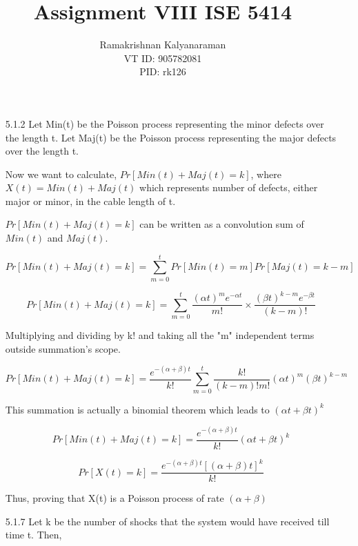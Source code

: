 \documentclass[a4paper,oneside,12pt]{report}
\begin{document}
\pagestyle{empty} %



\title{Assignment VIII ISE 5414}
\author{Ramakrishnan Kalyanaraman\\
VT ID: 905782081\\
PID: rk126}
\maketitle

\begin{enumerate}
	\item[5.1.2] Let Min(t) be the Poisson process representing the minor defects over the length t. Let Maj(t) be the Poisson process representing the major defects over the length t.
	
	Now we want to calculate, $Pr[Min(t) + Maj(t) = k]$, where $X(t) = Min(t) + Maj(t)$ which represents number of defects, either major or minor, in the cable length of t.
	
	$Pr[Min(t) + Maj(t) = k]$ can be written as a convolution sum of $Min(t)$ and $Maj(t)$.
	
	$$Pr[Min(t) + Maj(t) = k] = \sum_{m = 0}^{t}{Pr[Min(t) = m] Pr[Maj(t) = k - m]}$$
	
	$$Pr[Min(t) + Maj(t) = k] = \sum_{m = 0}^{t}{\frac{(\alpha t)^m e^{-\alpha t}}{m!} \times \frac{(\beta t)^{k-m} e^{-\beta t}}{(k - m)!}}$$
	
	Multiplying and dividing by k! and taking all the "m" independent terms outside summation's scope.
	
	$$Pr[Min(t) + Maj(t) = k] = \frac{e^{-(\alpha + \beta)t}}{k!} \sum_{m = 0}^{t}{\frac{k!}{(k - m)! m!} (\alpha t)^m (\beta t)^{k - m}}$$
	
	This summation is actually a binomial theorem which leads to $(\alpha t + \beta t)^k$
	
	$$Pr[Min(t) + Maj(t) = k] = \frac{e^{-(\alpha + \beta)t}}{k!} (\alpha t + \beta t)^k$$
	
	$$Pr[X(t) = k] = \frac{e^{-(\alpha + \beta)t} [(\alpha + \beta)t]^k}{k!}$$
	
	Thus, proving that X(t) is a Poisson process of rate $(\alpha + \beta)$
	
	\item[5.1.7] Let k be the number of shocks that the system would have received till time t. Then,
	

\end{enumerate}
\end{document}
